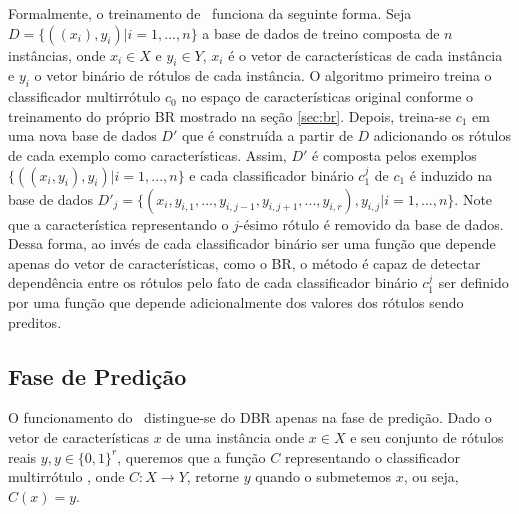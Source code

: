   Formalmente, o treinamento de \MRLM~funciona da seguinte forma.
  Seja $D=\{((x_i),y_i)|i=1,...,n\}$ a base de dados de treino composta de $n$ instâncias,
  onde $x_i \in X$ e $y_i \in Y$,
  $x_i$ é o vetor de características de cada instância
  e $y_i$ o vetor binário de rótulos de cada instância.
  O algoritmo primeiro treina o classificador multirrótulo $c_0$
  no espaço de características original conforme o treinamento do próprio BR mostrado na seção \ref{sec:br}.
  Depois, treina-se $c_1$ em uma nova base de dados $D'$ que é construída a partir de $D$ adicionando os rótulos de cada
  exemplo como características. Assim, $D'$ é composta pelos exemplos $\{((x_i,y_i),y_i) |i=1,...,n\}$ e
  cada classificador binário $c_1^j$ de $c_1$ é induzido na base de dados $D'_j=\{(x_i,y_{i,1},...,y_{i,j-1},y_{i,j+1},...,y_{i,r}),y_{i,j} | i=1,...,n\}$.
  Note que a característica representando o $j$-ésimo rótulo é removido da base de dados.
  Dessa forma, ao invés de cada classificador binário ser uma função 
  que depende apenas do vetor de características, como o BR,
  o método é capaz de detectar dependência entre os rótulos pelo fato de
  cada classificador binário $c_1^j$ 
  ser definido por uma função que depende adicionalmente dos valores dos rótulos sendo preditos.
 
 \subsection{Fase de Predição}
 \label{sec:mrlm_prediction}
 O funcionamento do \MRLMa~distingue-se do DBR apenas na fase de predição.
 Dado o vetor de características $x$ de uma instância 
 onde $x\in X$ e seu conjunto de rótulos reais $y,y \in {\{0,1\}}^r$, queremos que a função $C$
 representando o classificador multirrótulo \MRLMa, onde $C:X\rightarrow Y$,
 retorne $y$ quando o submetemos $x$, ou seja, $C(x)=y$.
 

